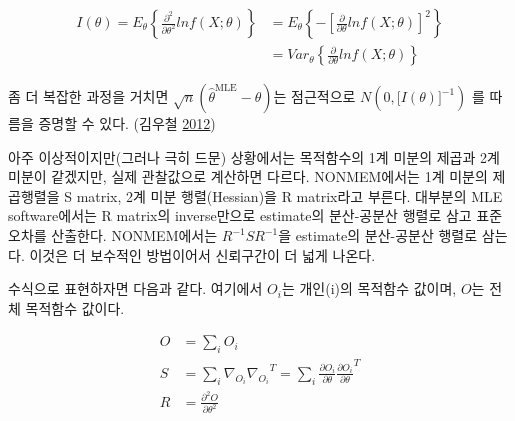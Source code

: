 \documentclass[
  11pt,
  krantz2, a4paper, twoside]{krantz}
\theoremstyle{definition}
\theoremstyle{definition}
\theoremstyle{definition}
\theoremstyle{remark}
\begin{document}
\begin{equation}
\begin{split}
I(\theta) = E_{\theta}\left\{ \frac{\partial^{2}}{\partial\theta^{2}}lnf(X;\theta) \right\} & = E_{\theta}\left\{ - \left\lbrack \frac{\partial}{\partial\theta}lnf(X;\theta) \right\rbrack^{2} \right\} \\
&= Var_{\theta}\left\{ \frac{\partial}{\partial\theta}lnf(X;\theta) \right\} 
\end{split}
\label{eq:diff-diff-2}
\end{equation}

좀 더 복잡한 과정을 거치면 \(\sqrt{n}({\widehat{\theta}}^{\text{MLE}} - \theta)\)는 점근적으로 \(N(0,\lbrack I(\theta)\rbrack^{- 1})\) 를 따름을 증명할 수 있다. (김우철 \protect\hyperlink{ref-kim}{2012})

아주 이상적이지만(그러나 극히 드문) 상황에서는 목적함수의 1계 미분의 제곱과 2계 미분이 같겠지만, 실제 관찰값으로 계산하면
다르다. NONMEM에서는 1계 미분의 제곱행렬을 S matrix, 2계 미분 행렬(Hessian)을 R matrix라고
부른다. 대부분의 MLE software에서는 R matrix의 inverse만으로 estimate의 분산-공분산 행렬로 삼고
표준오차를 산출한다. NONMEM에서는 \(R^{- 1}SR^{- 1}\)을 estimate의 분산-공분산 행렬로 삼는다. 이것은
더 보수적인 방법이어서 신뢰구간이 더 넓게 나온다.

수식으로 표현하자면 다음과 같다. 여기에서 \(O_{i}\)는 개인(i)의 목적함수 값이며, \(O\)는 전체 목적함수 값이다.

\begin{equation}
\begin{split}
O &= \sum_{i}^{}O_{i} \\
S &= \sum_{i}^{}{\nabla_{O_{i}}{\nabla_{O_{i}}}^{T}} = \sum_{i}^{}\frac{\partial O_{i}}{\partial\theta}\frac{\partial O_{i}}{\partial\theta}^{T} \\
R &= \frac{\partial^{2}O}{\partial\theta^{2}}
\end{split}
\label{eq:o-s-r}
\end{equation}
\end{document}
